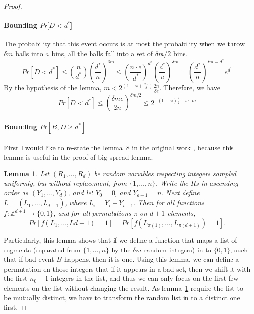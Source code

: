 \documentclass[a4paper, oneside]{article}
\newtheorem{lemma}{Lemma}
\begin{document}
\begin{proof}
  \paragraph{Bounding $Pr[D < d^*$]}
  The probability that this event occurs is at most the probability when we throw $\delta m$ balls into $n$ bins, all the balls fall into a set of
  $\delta m/2$ bins.
  \begin{equation}
    Pr[D < d^*] \leq \binom{n}{d^*}(\frac{d^*}{n})^{\delta m} \leq (\frac{n \cdot e}{d^*})^{d^*}(\frac{d^*}{n})^{\delta m} = (\frac{d^*}{n})^{\delta m - d^*}e^{d^*}
  \end{equation}
  By the hypothesis of the lemma, $m < 2^{(1-\omega + \frac{2\omega}{\delta})}\frac{2n}{\delta e}$. Therefore, we have
  \begin{equation}
    Pr[D < d^*] \leq (\frac{\delta me}{2n})^{\delta m/2} \leq 2^{[(1-\omega)\frac{\delta}{2}+\omega]m}
  \end{equation}

  \paragraph{Bounding $Pr[B, D \geq d^*]$}
  First I would like to re-state the lemma~8 in the original work \cite{corrigan2016balloon}, because this lemma is useful in the proof of big spread lemma.
  \begin{lemma}\label{lemma::randommap}
    Let $(R_1,\dots,R_d)$ be random variables respecting integers sampled uniformly, but without replacement, from $\{1,\dots,n\}$. Write the $R$s in ascending
    order as $(Y_1,\dots,Y_d)$, and let $Y_0 = 0$, and $Y_{d+1} = n$. Next define $L = (L_1,\dots,L_{d+1})$, where $L_i = Y_i - Y_{i-1}$. Then for all functions
    $f:\mathbb{Z}^{d+1} \rightarrow \{0,1\}$, and for all permutations $\pi$ on $d+1$ elements,
    \begin{equation}
      Pr[f(L_1,\dots,L{d+1}) = 1] = Pr[f(L_{\pi(1)},\dots,L_{\pi(d+1)}) = 1].
    \end{equation}
  \end{lemma}

  Particularly, this lemma shows that if we define a function that maps a list of segments (separated from $\{1,\dots,n\}$ by the $\delta m$ random integers)
  in to $\{0,1\}$, such that
  if bad event $B$ happens, then it is one. Using this lemma, we can define a permutation on those integers that if it appears in a bad set, then we shift it with
  the first $n_0+1$ integers in the list, and thus we can only focus on the first few elements on the list without changing the result. As lemma~\ref{lemma::randommap}
  require the list to be mutually distinct, we have to transform the random list in to a distinct one first.


\end{proof}
\end{document}
